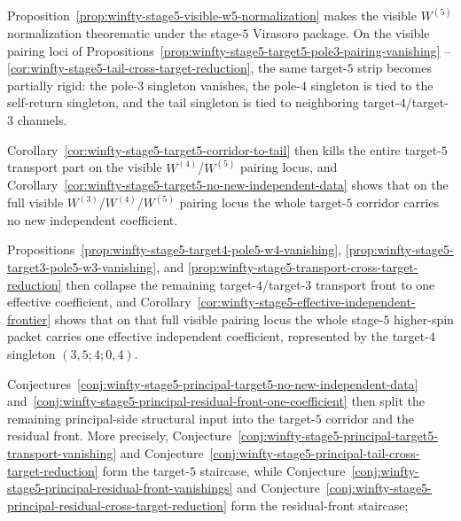 \begin{remark}
Proposition~\ref{prop:winfty-stage5-visible-w5-normalization} makes the
visible $W^{(5)}$ normalization theorematic under the stage-$5$
Virasoro package.  On the visible pairing loci of
Propositions~\ref{prop:winfty-stage5-target5-pole3-pairing-vanishing}
--\ref{cor:winfty-stage5-tail-cross-target-reduction}, the same
target-$5$ strip becomes partially rigid: the pole-$3$ singleton
vanishes, the pole-$4$ singleton is tied to the self-return singleton,
and the tail singleton is tied to neighboring target-$4$/target-$3$
channels.

Corollary~\ref{cor:winfty-stage5-target5-corridor-to-tail}
then kills the entire target-$5$ transport part on the visible
$W^{(4)}$/$W^{(5)}$ pairing locus, and
Corollary~\ref{cor:winfty-stage5-target5-no-new-independent-data}
shows that on the full visible
$W^{(3)}$/$W^{(4)}$/$W^{(5)}$ pairing locus the whole target-$5$
corridor carries no new independent coefficient.

Propositions~\ref{prop:winfty-stage5-target4-pole5-w4-vanishing},
\ref{prop:winfty-stage5-target3-pole5-w3-vanishing}, and
\ref{prop:winfty-stage5-transport-cross-target-reduction} then collapse
the remaining target-$4$/target-$3$ transport front to one effective
coefficient, and
Corollary~\ref{cor:winfty-stage5-effective-independent-frontier} shows
that on that full visible pairing locus the whole stage-$5$
higher-spin packet carries one effective independent coefficient,
represented by the target-$4$ singleton \((3,5;4;0,4)\).

Conjectures~\ref{conj:winfty-stage5-principal-target5-no-new-independent-data}
and~\ref{conj:winfty-stage5-principal-residual-front-one-coefficient}
then split the remaining principal-side structural input into the
target-$5$ corridor and the residual front.  More precisely,
Conjecture~\ref{conj:winfty-stage5-principal-target5-transport-vanishing}
and
Conjecture~\ref{conj:winfty-stage5-principal-tail-cross-target-reduction}
form the target-$5$ staircase, while
Conjecture~\ref{conj:winfty-stage5-principal-residual-front-vanishings}
and
Conjecture~\ref{conj:winfty-stage5-principal-residual-cross-target-reduction}
form the residual-front staircase;


\end{remark}
